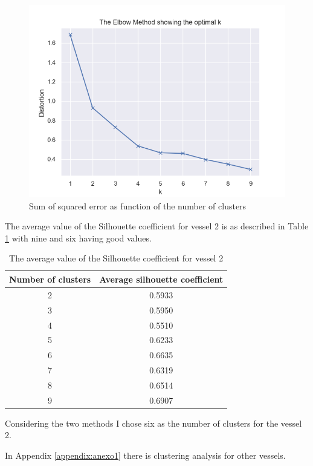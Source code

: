 \begin{figure}[]
\centering
\includegraphics[width=0.8\linewidth]{Chapters/img/elbow_method.png}
\caption{Sum of squared error as function of the number of clusters}
\label{fig:elbow_method}
\end{figure}


The average value of the Silhouette coefficient for vessel 2 is as described in Table \ref{table:vessel2_silhouette} with nine and six having good values.

\begin {table}[H]
\caption {The average value of the Silhouette coefficient for vessel 2}
\begin{center}
\begin{tabular}{c|c}
\textbf{Number of clusters} & \textbf{Average silhouette coefficient}  \\
\hline
2 & 0.5933  \\
3 & 0.5950  \\
4 & 0.5510  \\
5 & 0.6233  \\
6 & 0.6635  \\
7 & 0.6319  \\
8 & 0.6514  \\
9 & 0.6907  
\label{table:vessel2_silhouette}
\end{tabular}
\end{center}
\end {table}


Considering the two methods I chose six as the number of clusters for the vessel 2.

In Appendix \ref{appendix:anexo1} there is clustering analysis for other vessels.



